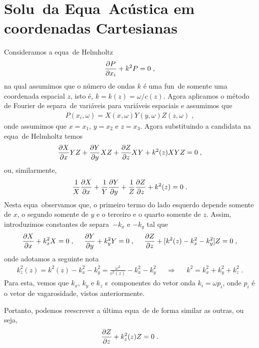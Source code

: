 
\section[Equa\cao\ Ac\'ustica em coordenadas Cartesianas]{Solu\cao\ da
Equa\cao\ Ac\'ustica em coordenadas Cartesianas}

Consideramos a equa\cao\ de Helmholtz
\begin{eqnarray} \label{helmholtz}
\frac{\partial P}{\partial x_i} + k^2 P = 0 \; ,
\end{eqnarray}
na qual assumimos que o n\'umero de ondas $k$ \'e uma fun\cao\
de somente uma coordenada espacial $z$, isto \'e, $k=k(z)=\omega/c(z)$.
Agora aplicamos o m\'etodo de Fourier de separa\cao\ de vari\'aveis
para vari\'aveis espaciais e assumimos que
\begin{eqnarray} \label{candidata}
P(x_i,\omega) = X(x,\omega) Y(y,\omega) Z(z,\omega) \; ,
\end{eqnarray}
onde assumimos que $x=x_1$, $y=x_2$ e $z=x_3$. Agora substituindo a
candidata \refi{candidata} na equa\cao\ de Helmholtz temos
\begin{eqnarray}
\frac{\partial X}{\partial x}YZ + \frac{\partial Y}{\partial y}XZ + \frac{\partial Z}{\partial z}XY + k^2(z)XYZ = 0 \; ,
\end{eqnarray}
ou, similarmente,
\begin{eqnarray}
\frac{1}{X}\frac{\partial X}{\partial x} + \frac{1}{Y}\frac{\partial Y}{\partial y} +
\frac{1}{Z}\frac{\partial Z}{\partial z} + k^2(z) = 0 \; .
\end{eqnarray}
Nesta equa\cao\ observamos que, o primeiro termo do lado esquerdo depende
somente de $x$, o segundo somente de $y$ e o terceiro e o quarto
somente de $z$. Assim, introduzimos constantes de separa\cao\
$-k_x$ e $-k_y$ tal que
\begin{eqnarray} \label{ohxyz}
\frac{\partial X}{\partial x} + k_x^2 X = 0 \; , \;\;\;\;\; \frac{\partial Y}{\partial y} + k_y^2 Y =
0 \; , \;\;\;\;\; \frac{\partial Z}{\partial z} + [k^2(z) - k_x^2 - k_y^2]Z = 0 \; ,
\end{eqnarray} 
onde adotamos a seguinte nota\cao\
\begin{eqnarray}
k_z^2(z) = k^2(z) - k_x^2 - k_y^2 = \frac{\omega^2}{c^2(z)} - k_x^2 - k_y^2
\;\;\;\;\; \Longrightarrow \;\;\;\;\; k^2 = k_x^2 + k_y^2 + k_z^2 \; .
\end{eqnarray}
Para esta, vemos que $k_x$, $k_y$ e $k_z$ s\ao\ componentes do vetor
onda $k_i = \omega p_i$, onde $p_i$ \'e o vetor de vagarosidade, vistos
anteriormente.

Portanto, podemos reescrever a \'ultima equa\cao\ de \refi{ohxyz} de
forma similar as outras, ou seja,
\begin{eqnarray}
\frac{\partial Z}{\partial z} + k_z^2(z) Z = 0 \; .
\end{eqnarray}

